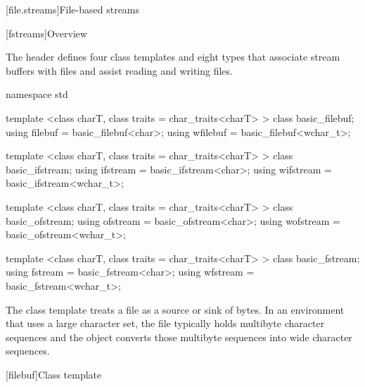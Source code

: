 [file.streams]{File-based streams}

[fstreams]{Overview}

\pnum
The header
defines four class templates and eight types
that associate stream buffers with files and assist
reading and writing files.

%
%
%
%
%
%
%
%
%
%
%
%
%
%
%
%
%
\begin{codeblock}
namespace std {
  template <class charT, class traits = char_traits<charT> >
    class basic_filebuf;
  using filebuf  = basic_filebuf<char>;
  using wfilebuf = basic_filebuf<wchar_t>;

  template <class charT, class traits = char_traits<charT> >
    class basic_ifstream;
  using ifstream  = basic_ifstream<char>;
  using wifstream = basic_ifstream<wchar_t>;

  template <class charT, class traits = char_traits<charT> >
    class basic_ofstream;
  using ofstream  = basic_ofstream<char>;
  using wofstream = basic_ofstream<wchar_t>;

  template <class charT, class traits = char_traits<charT> >
    class basic_fstream;
  using fstream  = basic_fstream<char>;
  using wfstream = basic_fstream<wchar_t>;
}
\end{codeblock}

\pnum
\begin{note} The class template  treats a file as a source or
sink of bytes. In an environment that uses a large character set, the file
typically holds multibyte character sequences and the 
object converts those multibyte sequences into wide character sequences.
\end{note}

[filebuf]{Class template }

